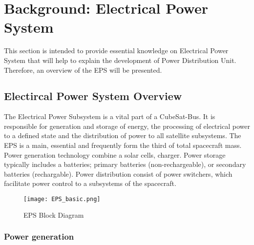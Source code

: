 \chapter{Background: Electrical Power System  \label{cha:chapter2}}
This section is intended to provide essential knowledge on Electrical Power System that will help to explain the development of Power Distribution Unit.
Therefore, an overview of the EPS will be presented. 

\section{Electircal Power System Overview \label{sec:tech}}
The Electrical Power Subsystem is a vital part of a CubeSat-Bus. It is responsible for generation and storage of energy, the processing of electrical power to a defined state and the distribution of power to all satellite subsystems. The EPS is a main, essential and frequently form the third of total spacecraft mass. Power generation technology combine a solar cells, charger. Power storage typically includes a batteries; primary batteries (non-rechargeable), or secondary batteries (rechargable). Power distribution consist of power switchers, which facilitate power control to a subsystems of the spacecraft.



	\begin{figure}[h]
		\centering
		\texttt{[image: EPS\_basic.png]}
			\caption{EPS Block Diagram}
			\label{fig: EPS}
	\end{figure}

\subsection{Power generation \label{sec:tech}}



